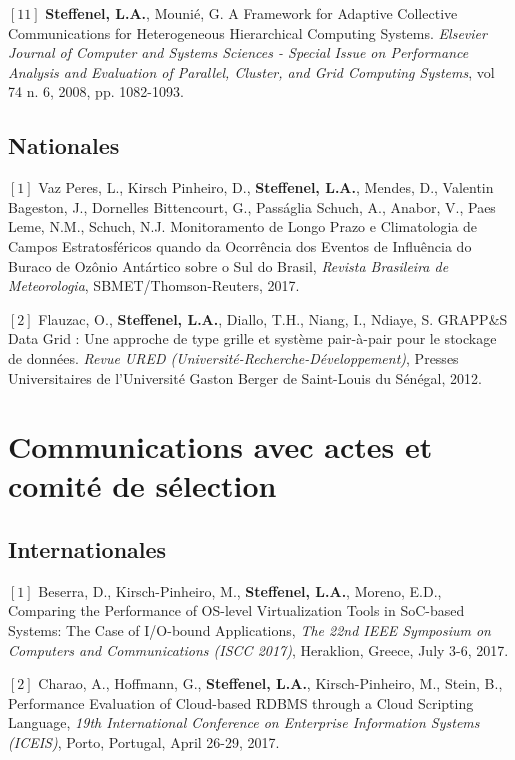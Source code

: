 \documentclass[final,twoside]{hdr} %
\begin{document}
\vspace{1em} \noindent $[11]$
{\bf Steffenel, L.A.}, Mounié, G. {A Framework for Adaptive Collective Communications for Heterogeneous Hierarchical Computing Systems}. {\em Elsevier Journal of Computer and Systems Sciences - Special Issue on Performance Analysis and Evaluation of Parallel, Cluster, and Grid Computing Systems}, vol 74 n. 6, 2008, pp. 1082-1093.


\subsection*{Nationales}

 \noindent $[1]$
Vaz Peres, L., Kirsch Pinheiro, D., {\bf Steffenel, L.A.}, Mendes, D., Valentin Bageston, J., Dornelles Bittencourt, G., Passáglia Schuch, A., Anabor, V., Paes Leme, N.M., Schuch, N.J. {Monitoramento de Longo Prazo e Climatologia de Campos Estratosféricos quando da Ocorrência dos Eventos de Influência do Buraco de Ozônio Antártico sobre o Sul do Brasil}, {\em Revista Brasileira de Meteorologia}, SBMET/Thomson-Reuters, 2017.

\vspace{1em} \noindent $[2]$
Flauzac, O., {\bf Steffenel, L.A.}, Diallo, T.H., Niang, I., Ndiaye, S. {GRAPP\&S Data Grid : Une approche de type grille et système pair-à-pair pour le stockage de données}. {\em Revue URED (Université-Recherche-Développement)}, Presses Universitaires de l'Université Gaston Berger de Saint-Louis du Sénégal, 2012.

\section*{Communications avec actes et comité de sélection}

\subsection*{Internationales}

\noindent $[1]$
Beserra, D., Kirsch-Pinheiro, M., {\bf Steffenel, L.A.},  Moreno, E.D., {Comparing the Performance of OS-level Virtualization Tools in SoC-based Systems: The Case of I/O-bound Applications}, {\em The 22nd IEEE Symposium on Computers and Communications (ISCC 2017)}, Heraklion, Greece, July 3-6, 2017.

\vspace{1em} \noindent $[2]$
Charao, A., Hoffmann, G., {\bf Steffenel, L.A.}, Kirsch-Pinheiro, M., Stein, B., {Performance Evaluation of Cloud-based RDBMS through a Cloud Scripting Language}, {\em 19th International Conference on Enterprise Information Systems (ICEIS)}, Porto, Portugal, April 26-29, 2017.
\end{document}
